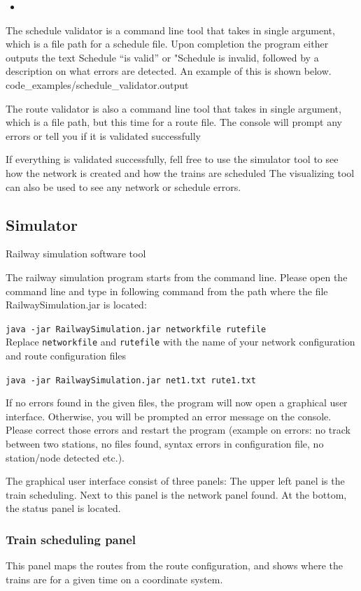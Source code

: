 \documentclass[10pt,a4paper]{article}
\def\Code#1{\texttt{#1}}
\begin{document}
\begin{itemize}
 \item 
\end{itemize}
The schedule validator is a command line tool that takes in single argument, which is a file path for a schedule file. Upon completion the program either outputs the text Schedule ``is valid'' or "Schedule is invalid, followed by a description on what errors are detected. An example of this is shown below.
 {code_examples/schedule_validator.output}

The route validator is also a command line tool that takes in single argument, which is a file path, but this time for  a route file.
The console will prompt any errors or tell you if it is validated successfully

If everything is validated successfully, fell free to use the simulator tool to see how the network is created and how the trains are scheduled
The visualizing tool can also be used to see any network or schedule errors.

\subsection{Simulator}
Railway simulation software tool

The railway simulation program starts from the command line. Please open the command line and type in following command from the path where the file RailwaySimulation.jar is located:

\Code{java -jar RailwaySimulation.jar networkfile rutefile}\\
 Replace \Code{networkfile} and \Code{rutefile} with the name of your network configuration and route configuration files
 
\Code{java -jar RailwaySimulation.jar net1.txt rute1.txt}

If no errors found in the given files, the program will now open a graphical user interface. Otherwise, you will be prompted an error message on the console. Please correct those errors and restart the program (example on errors: no track between two stations, no files found, syntax errors in configuration file, no station/node detected etc.).
 
The graphical user interface consist of three panels:
The upper left panel is the train scheduling. Next to this panel is the network panel found. At the bottom, the status panel is located.

\subsubsection{Train scheduling panel}
This panel maps the routes from the route configuration, and shows where the trains are for a given time on a coordinate system.
 
\end{document}

